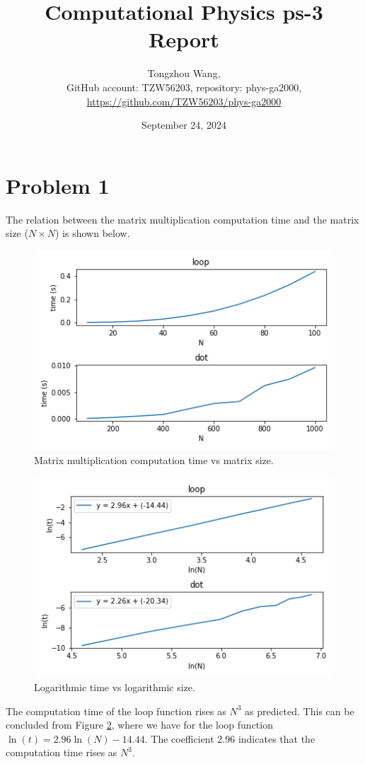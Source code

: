 \documentclass[11pt]{article}
\title{Computational Physics ps-3 Report}
\author{Tongzhou Wang, \\ GitHub account: TZW56203, repository: phys-ga2000, \\ \url{https://github.com/TZW56203/phys-ga2000}}
\date{September 24, 2024}
\begin{document}
\maketitle

\section{Problem 1}
The relation between the matrix multiplication computation time and the matrix size ($N \times N$) is shown below.
\begin{figure}[H]
    \centering
    \includegraphics[scale = 1.0]{images/t-N.png}
    \caption{Matrix multiplication computation time vs matrix size.}
    \label{fig:t-N}
\end{figure}
\begin{figure}[H]
    \centering
    \includegraphics[scale = 1.0]{images/lnt-lnN.png}
    \caption{Logarithmic time vs logarithmic size.}
    \label{fig:lnt-lnN}
\end{figure}

The computation time of the loop function rises as $N^3$ as predicted. This can be concluded from Figure \ref{fig:lnt-lnN}, where we have for the loop function $\ln{(t)} = 2.96 \ln{(N)} - 14.44$. The coefficient 2.96 indicates that the computation time rises as $N^3$.
\end{document}

